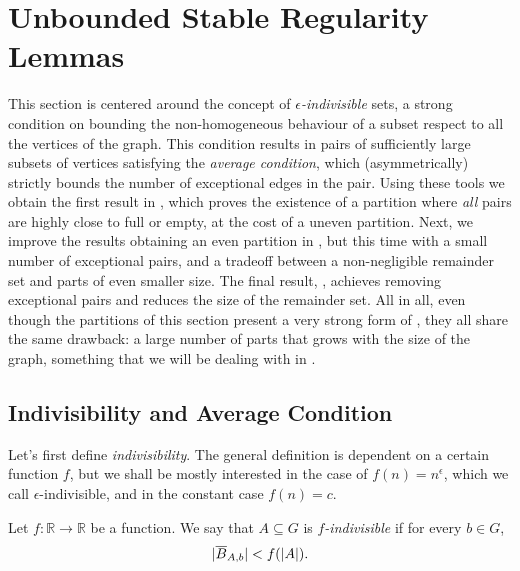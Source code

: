 \section{Unbounded Stable Regularity Lemmas} \label{sec:section_4}

    This section is centered around the concept of \emph{$\epsilon$-indivisible} sets, a strong condition on bounding the
    non-homogeneous behaviour of a subset respect to all the vertices of the graph.
    This condition results in pairs of sufficiently large subsets of vertices satisfying
    the \emph{average condition}, which (asymmetrically) strictly bounds the number of exceptional edges in the pair.
    Using these tools we obtain the first result in ,
    which proves the existence of a partition where \emph{all} pairs are highly close to full or empty, at the cost of a
    uneven partition.
    Next, we improve the results obtaining an even partition in
    , but this time with a
    small number of exceptional pairs, and a tradeoff between a non-negligible remainder set and parts of even smaller size.
    The final result, , achieves removing exceptional pairs
    and reduces the size of the remainder set.
    All in all, even though the partitions of this section present a very strong form of \regularity, they all share
    the same drawback: a large number of parts that grows with the size of the graph, something that we will be dealing
    with in .

    \subsection{Indivisibility and Average Condition} \label{subsec:subsection_4.1}

        Let's first define \emph{indivisibility}.
        The general definition is dependent on a certain function $f$, but we shall be mostly
        interested in the case of $f(n) = n^\epsilon$, which we call $\epsilon$-indivisible, and in the constant case $f(n) = c$.

        \begin{definition} \label{def:f_indivisible}
            Let $f: \mathbb{R} \longrightarrow \mathbb{R}$ be a function.
            We say that $A \subseteq G$ is \emph{$f$-indivisible} if for every $b \in G$,
            \[
                | \overline{B}_{A,b} | < f(|A|).
            \]
        \end{definition}

